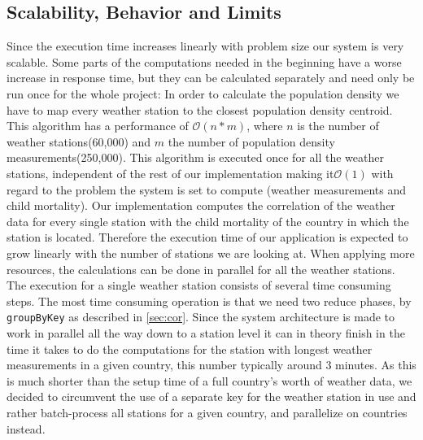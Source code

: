 \documentclass[
10pt, %
a4paper, %
oneside, %
headinclude,footinclude, %
useAMS,
usenatbib
]{template/mn2e}  %
\begin{document}
\subsection{Scalability, Behavior and Limits} \label{Scalability}
Since the execution time increases linearly with problem size our system is very scalable. Some parts of the computations needed in the beginning have a worse increase in response time, but they can be calculated separately and need only be run once for the whole project:  In order to calculate the population density we have to map every weather station to the closest population density centroid. This algorithm has a performance of $\mathcal O(n*m)$, where $n$ is the number of weather stations(60,000) and $m$ the number of population density measurements(250,000). This algorithm is executed once for all the weather stations, independent of the rest of our implementation making it$\mathcal O(1)$ with regard to the problem the system is set to compute (weather measurements and child mortality). Our implementation computes the correlation of the weather data for every single station with the child mortality of the country in which the station is located. Therefore the execution time of our application is expected to grow linearly with the number of stations we are looking at. When applying more resources, the calculations can be done in parallel for all the weather stations.  The execution for a single weather station consists of several time consuming steps. The most time consuming operation is that we need two reduce phases, by \texttt{groupByKey} as described in \ref{sec:cor}. Since the system architecture is made to work in parallel all the way down to a station level it can in theory finish in the time it takes to do the computations for the station with longest weather measurements in a given country, this number typically around 3 minutes. As this is much shorter than the setup time of a full country's worth of weather data, we decided to circumvent the use of a separate key for the weather station in use and rather batch-process all stations for a given country, and parallelize on countries instead.
\end{document}
